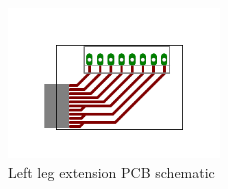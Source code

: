 \begin{figure}[ht]
	\centering
	\includegraphics[width=0.5\textwidth]{figures/expansion_board.pdf}
	\caption{Left leg extension PCB schematic}
	\label{fig:pcb1}
\end{figure}




